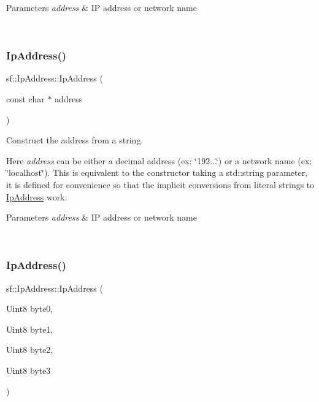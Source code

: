 \begin{DoxyParams}{Parameters}
{\em address} & IP address or network name \begin{DoxyVerb}\end{DoxyVerb}
 \\
\hline
\end{DoxyParams}
\mbox{\label{classsf_1_1_ip_address_a92f2a9be74334a61b96c2fc79fe6eb78}} 
\subsubsection{\texorpdfstring{IpAddress()}{IpAddress()}\hspace{0.1cm}{\footnotesize\ttfamily [3/5]}}
{\footnotesize\ttfamily sf\+::\+Ip\+Address\+::\+Ip\+Address (\begin{DoxyParamCaption}\item[{const char $\ast$}]{address }\end{DoxyParamCaption})}



Construct the address from a string. 

Here {\itshape address} can be either a decimal address (ex\+: \char`\"{}192...\char`\"{}) or a network name (ex\+: \char`\"{}localhost\char`\"{}). This is equivalent to the constructor taking a std\+::string parameter, it is defined for convenience so that the implicit conversions from literal strings to \mbox{\hyperlink{classsf_1_1_ip_address}{Ip\+Address}} work.


\begin{DoxyParams}{Parameters}
{\em address} & IP address or network name \begin{DoxyVerb}\end{DoxyVerb}
 \\
\hline
\end{DoxyParams}
\mbox{\label{classsf_1_1_ip_address_a1d289dcb9ce7a64c600c6f84cba88cc6}} 
\subsubsection{\texorpdfstring{IpAddress()}{IpAddress()}\hspace{0.1cm}{\footnotesize\ttfamily [4/5]}}
{\footnotesize\ttfamily sf\+::\+Ip\+Address\+::\+Ip\+Address (\begin{DoxyParamCaption}\item[{Uint8}]{byte0,  }\item[{Uint8}]{byte1,  }\item[{Uint8}]{byte2,  }\item[{Uint8}]{byte3 }\end{DoxyParamCaption})}



